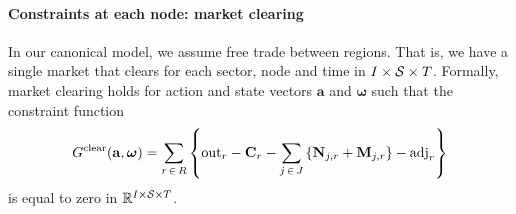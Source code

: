 \documentclass[12pt,a4paper,twoside, draft]{article}
\begin{document}
\paragraph{Constraints at each node: market clearing}
In our canonical model, we assume free trade between regions.
That is, we have a single market that clears for each sector, node and time in
$I \times \mathcal{S} \times T$.
Formally, market clearing holds for action and state vectors $\mathbf{a}$
and $\boldsymbol{\omega}$ such that the constraint function
\begin{equation}\label{eq-market-clearing}
  G^{\textup{clear}}(\mathbf{a}, \boldsymbol{\omega}) =
  \sum_{r \,\in\, R} \left\{
  \textup{out}_{r}
  - \mathbf{C}_{r}
  - \sum_{j \,\in\, J}
      \left\{\mathbf{N}_{j, r} + \mathbf{M}_{j, r}\right\}
  - \textup{adj}_{r} \right\}
\end{equation}
is equal to zero in $\mathbb R^{I \times  \mathcal{S} \times T}$.
\end{document}

